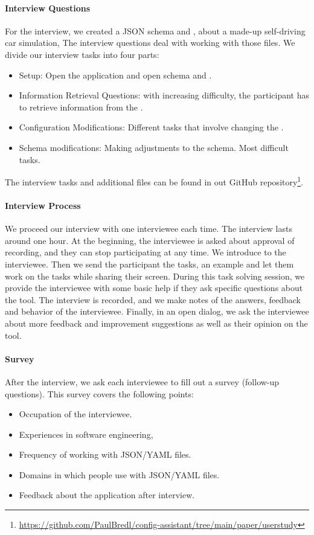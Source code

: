 \paragraph{Interview Questions}
For the interview, we created a JSON schema and \cfgfile{}, about a made-up self-driving car simulation,
The interview questions deal with working with those files.
We divide our interview tasks into four parts:
\begin{itemize}
    \item Setup: Open the application and open schema and \cfgfile.
    \item Information Retrieval Questions: with increasing difficulty, the participant has to retrieve information from the \cfgfile{}.
    \item Configuration Modifications: Different tasks that involve changing the \cfgfile{}.
    \item Schema modifications: Making adjustments to the schema.
    Most difficult tasks.
\end{itemize}

The interview tasks and additional files can be found in out GitHub repository\footnote{\url{https://github.com/PaulBredl/config-assistant/tree/main/paper/userstudy}}.

\paragraph{Interview Process}
We proceed our interview with one interviewee each time.
The interview lasts around one hour.
At the beginning, the interviewee is asked about approval of recording, and they can stop participating at any time.
We introduce \toolname{} to the interviewee.
Then we send the participant the tasks, an example \cfgfile{} and let them work on the tasks while sharing their screen.
During this task solving session, we provide the interviewee with some basic help if they ask specific questions about the tool.
The interview is recorded, and we make notes of the answers, feedback and behavior of the interviewee.
Finally, in an open dialog, we ask the interviewee about more feedback and improvement suggestions as well as their opinion on the tool.

\paragraph{Survey}
After the interview, we ask each interviewee to fill out a survey (follow-up questions).
This survey covers the following points:
\begin{itemize}
    \item Occupation of the interviewee.
    \item Experiences in software engineering,
    \item Frequency of working with JSON/YAML files.
    \item Domains in which people use with JSON/YAML files.
    \item Feedback about the application after interview.
\end{itemize}

